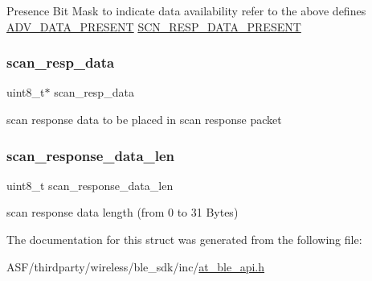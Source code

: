 Presence Bit Mask to indicate data availability refer to the above defines \mbox{\hyperlink{at__ble__api_8h_ad35ea6c7ddf7f4ba30514bd6c2c11232}{A\+D\+V\+\_\+\+D\+A\+T\+A\+\_\+\+P\+R\+E\+S\+E\+NT}} \mbox{\hyperlink{at__ble__api_8h_a2e78b0afe66c462d12ce94807f14785a}{S\+C\+N\+\_\+\+R\+E\+S\+P\+\_\+\+D\+A\+T\+A\+\_\+\+P\+R\+E\+S\+E\+NT}} \mbox{\label{structat__ble__adv__data__update__on__the__fly__t_a0e003239e5e63c936174be59bc0ffcfa}} 
\subsubsection{\texorpdfstring{scan\_resp\_data}{scan\_resp\_data}}
{\footnotesize\ttfamily uint8\+\_\+t$\ast$ scan\+\_\+resp\+\_\+data}

scan response data to be placed in scan response packet \mbox{\label{structat__ble__adv__data__update__on__the__fly__t_aa364778628ff80935bf4515826aae316}} 
\subsubsection{\texorpdfstring{scan\_response\_data\_len}{scan\_response\_data\_len}}
{\footnotesize\ttfamily uint8\+\_\+t scan\+\_\+response\+\_\+data\+\_\+len}

scan response data length (from 0 to 31 Bytes) 

The documentation for this struct was generated from the following file\+:\begin{DoxyCompactItemize}
\item 
A\+S\+F/thirdparty/wireless/ble\+\_\+sdk/inc/\mbox{\hyperlink{at__ble__api_8h}{at\+\_\+ble\+\_\+api.\+h}}\end{DoxyCompactItemize}
